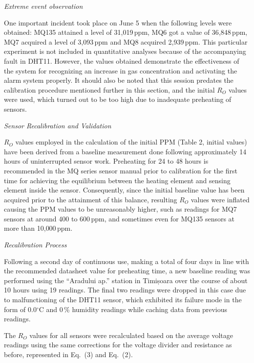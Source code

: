 \textit{Extreme event observation}

One important incident took place on June 5 when the following levels were obtained: MQ135
attained a level of 31{,}019\,ppm, MQ6 got a value of 36{,}848\,ppm, MQ7 acquired a level of
3{,}093\,ppm and MQ8 acquired 2{,}939\,ppm. This particular experiment is not included in
quantitative analyses because of the accompanying fault in DHT11. However, the values obtained
demonstrate the effectiveness of the system for recognizing an increase in gas concentration
and activating the alarm system properly. It should also be noted that this session predates
the calibration procedure mentioned further in this section, and the initial $R_O$ values were
used, which turned out to be too high due to inadequate preheating of sensors.

\textit{Sensor Recalibration and Validation}

$R_O$ values employed in the calculation of the initial PPM (Table 2, initial values) have
been derived from a baseline measurement done following approximately 14 hours of uninterrupted
sensor work. Preheating for 24 to 48 hours is recommended in the MQ series sensor manual prior
to calibration for the first time for achieving the equilibrium between the heating element and
sensing element inside the sensor. Consequently, since the initial baseline value has been
acquired prior to the attainment of this balance, resulting $R_O$ values were inflated causing
the PPM values to be unreasonably higher, such as readings for MQ7 sensors at around 400 to
600\,ppm, and sometimes even for MQ135 sensors at more than 10{,}000\,ppm.

\textit{Recalibration Process}

Following a second day of continuous use, making a total of four days in line with the
recommended datasheet value for preheating time, a new baseline reading was performed using the
``Aradului ap.'' station in Timișoara over the course of about 10 hours using 19 readings. The
final two readings were dropped in this case due to malfunctioning of the DHT11 sensor, which
exhibited its failure mode in the form of 0.0$^\circ$C and 0\,\% humidity readings while
caching data from previous readings.

The $R_O$ values for all sensors were recalculated based on the average voltage readings using
the same corrections for the voltage divider and resistance as before, represented in Eq.\ (3)
and Eq.\ (2).

